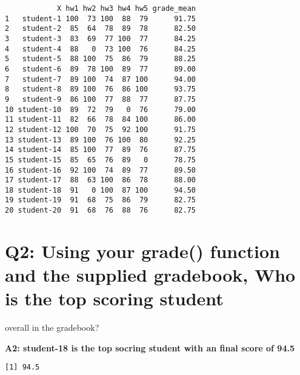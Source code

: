 \documentclass[
  letterpaper,
  DIV=11,
  numbers=noendperiod]{scrartcl}
\newenvironment{Shaded}{\begin{snugshade}}{\end{snugshade}}
\newcommand{\FunctionTok}[1]{\textcolor[rgb]{0.28,0.35,0.67}{#1}}
\newcommand{\NormalTok}[1]{\textcolor[rgb]{0.00,0.23,0.31}{#1}}
\newcommand{\SpecialCharTok}[1]{\textcolor[rgb]{0.37,0.37,0.37}{#1}}
\begin{document}
\begin{verbatim}
            X hw1 hw2 hw3 hw4 hw5 grade_mean
1   student-1 100  73 100  88  79      91.75
2   student-2  85  64  78  89  78      82.50
3   student-3  83  69  77 100  77      84.25
4   student-4  88   0  73 100  76      84.25
5   student-5  88 100  75  86  79      88.25
6   student-6  89  78 100  89  77      89.00
7   student-7  89 100  74  87 100      94.00
8   student-8  89 100  76  86 100      93.75
9   student-9  86 100  77  88  77      87.75
10 student-10  89  72  79   0  76      79.00
11 student-11  82  66  78  84 100      86.00
12 student-12 100  70  75  92 100      91.75
13 student-13  89 100  76 100  80      92.25
14 student-14  85 100  77  89  76      87.75
15 student-15  85  65  76  89   0      78.75
16 student-16  92 100  74  89  77      89.50
17 student-17  88  63 100  86  78      88.00
18 student-18  91   0 100  87 100      94.50
19 student-19  91  68  75  86  79      82.75
20 student-20  91  68  76  88  76      82.75
\end{verbatim}

\hypertarget{q2-using-your-grade-function-and-the-supplied-gradebook-who-is-the-top-scoring-student}{%
\section{Q2: Using your grade() function and the supplied gradebook, Who
is the top scoring
student}\label{q2-using-your-grade-function-and-the-supplied-gradebook-who-is-the-top-scoring-student}}

overall in the gradebook?

\textbf{A2: student-18 is the top socring student with an final score of
94.5}

\begin{Shaded}
\end{Shaded}

\begin{verbatim}
[1] 94.5
\end{verbatim}

\begin{Shaded}
\end{Shaded}
\end{document}
